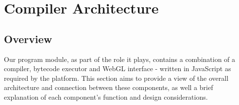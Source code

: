\documentclass{l3proj}
\begin{document}
\chapter{Compiler Architecture}
\label{arch}

\section{Overview}
\label{arch-over}

Our program module, as part of the role it plays, contains a combination of a compiler, bytecode executor and WebGL interface - written in JavaScript as required by the platform. This section aims to provide a view of the overall architecture and connection between these components, as well a brief explanation of each component's function and design considerations.
\end{document}
